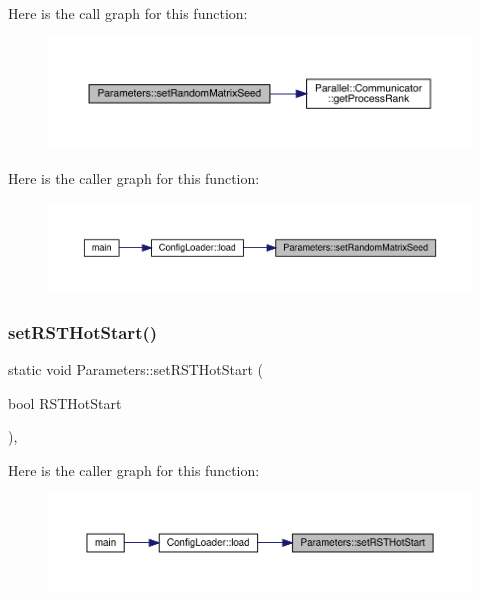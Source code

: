 Here is the call graph for this function\+:\nopagebreak
\begin{figure}[H]
\begin{center}
\leavevmode
\includegraphics[width=350pt]{class_parameters_a46615f8286bd7363ab1f09074fdc6940_cgraph}
\end{center}
\end{figure}
Here is the caller graph for this function\+:\nopagebreak
\begin{figure}[H]
\begin{center}
\leavevmode
\includegraphics[width=350pt]{class_parameters_a46615f8286bd7363ab1f09074fdc6940_icgraph}
\end{center}
\end{figure}
\mbox{\label{class_parameters_a84d9a6f8a32bbe13f7abe045453700a0}} 
\subsubsection{\texorpdfstring{setRSTHotStart()}{setRSTHotStart()}}
{\footnotesize\ttfamily static void Parameters\+::set\+R\+S\+T\+Hot\+Start (\begin{DoxyParamCaption}\item[{bool}]{R\+S\+T\+Hot\+Start }\end{DoxyParamCaption})\hspace{0.3cm}{\ttfamily [inline]}, {\ttfamily [static]}}

Here is the caller graph for this function\+:\nopagebreak
\begin{figure}[H]
\begin{center}
\leavevmode
\includegraphics[width=350pt]{class_parameters_a84d9a6f8a32bbe13f7abe045453700a0_icgraph}
\end{center}
\end{figure}
\mbox{\label{class_parameters_ae9fa4bf77247404758c43179849ae3bf}} 
